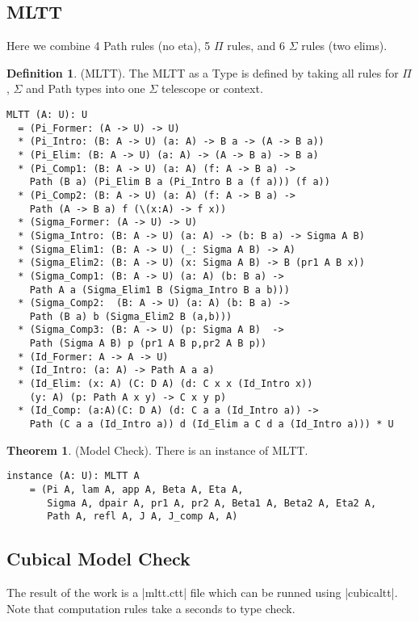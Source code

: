 \documentclass{article}
\theoremstyle{definition}
\newtheorem{theorem}{Theorem}
\newtheorem{definition}{Definition}
\begin{document}
\subsection{MLTT}
Here we combine 4 Path rules (no eta), 5 $\Pi$ rules, and 6 $\Sigma$ rules (two elims).
\begin{definition} (MLTT).
The MLTT as a Type is defined by taking all rules
for $\Pi$, $\Sigma$ and Path types into one $\Sigma$ telescope or context.
\begin{lstlisting}[mathescape=true]
MLTT (A: U): U
  = (Pi_Former: (A -> U) -> U)
  * (Pi_Intro: (B: A -> U) (a: A) -> B a -> (A -> B a))
  * (Pi_Elim: (B: A -> U) (a: A) -> (A -> B a) -> B a)
  * (Pi_Comp1: (B: A -> U) (a: A) (f: A -> B a) ->
    Path (B a) (Pi_Elim B a (Pi_Intro B a (f a))) (f a))
  * (Pi_Comp2: (B: A -> U) (a: A) (f: A -> B a) ->
    Path (A -> B a) f (\(x:A) -> f x))
  * (Sigma_Former: (A -> U) -> U)
  * (Sigma_Intro: (B: A -> U) (a: A) -> (b: B a) -> Sigma A B)
  * (Sigma_Elim1: (B: A -> U) (_: Sigma A B) -> A)
  * (Sigma_Elim2: (B: A -> U) (x: Sigma A B) -> B (pr1 A B x))
  * (Sigma_Comp1: (B: A -> U) (a: A) (b: B a) ->
    Path A a (Sigma_Elim1 B (Sigma_Intro B a b)))
  * (Sigma_Comp2:  (B: A -> U) (a: A) (b: B a) ->
    Path (B a) b (Sigma_Elim2 B (a,b)))
  * (Sigma_Comp3: (B: A -> U) (p: Sigma A B)  ->
    Path (Sigma A B) p (pr1 A B p,pr2 A B p))
  * (Id_Former: A -> A -> U)
  * (Id_Intro: (a: A) -> Path A a a)
  * (Id_Elim: (x: A) (C: D A) (d: C x x (Id_Intro x))
    (y: A) (p: Path A x y) -> C x y p)
  * (Id_Comp: (a:A)(C: D A) (d: C a a (Id_Intro a)) ->
    Path (C a a (Id_Intro a)) d (Id_Elim a C d a (Id_Intro a))) * U
\end{lstlisting}
\end{definition}

\begin{theorem} (Model Check).
There is an instance of MLTT.
\begin{lstlisting}
instance (A: U): MLTT A
    = (Pi A, lam A, app A, Beta A, Eta A,
       Sigma A, dpair A, pr1 A, pr2 A, Beta1 A, Beta2 A, Eta2 A,
       Path A, refl A, J A, J_comp A, A)
\end{lstlisting}
\end{theorem}

\subsection*{Cubical Model Check}

The result of the work is a |mltt.ctt| file which can be runned using |cubicaltt|.
Note that computation rules take a seconds to type check.
\end{document}
